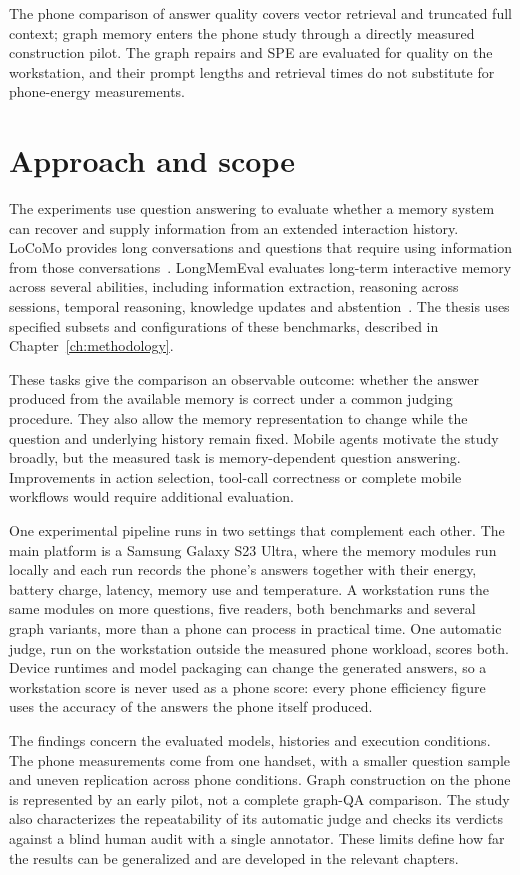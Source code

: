 The phone comparison of answer quality covers vector retrieval and truncated full context;
graph memory enters the phone study through a directly measured construction pilot. The graph
repairs and SPE are evaluated for quality on the workstation, and their prompt lengths and
retrieval times do not substitute for phone-energy measurements.

\section{Approach and scope}
\label{sec:ch1_scope}

The experiments use question answering to evaluate whether a memory system can recover
and supply information from an extended interaction history. LoCoMo provides long
conversations and questions that require using information from those
conversations~\citep{locomo}. LongMemEval evaluates long-term interactive memory across
several abilities, including information extraction, reasoning across sessions,
temporal reasoning, knowledge updates and abstention~\citep{longmemeval}. The thesis
uses specified subsets and configurations of these benchmarks, described in
Chapter~\ref{ch:methodology}.

These tasks give the comparison an observable outcome: whether the answer produced from
the available memory is correct under a common judging procedure. They also allow the
memory representation to change while the question and underlying history remain fixed.
Mobile agents motivate the study broadly, but the measured task is memory-dependent
question answering. Improvements in action selection, tool-call correctness or complete
mobile workflows would require additional evaluation.

One experimental pipeline runs in two settings that complement each other. The main
platform is a Samsung Galaxy S23 Ultra, where the memory modules run locally and each run
records the phone's answers together with their energy, battery charge, latency, memory use
and temperature. A workstation runs the same modules on more questions, five readers, both
benchmarks and several graph variants, more than a phone can process in practical time. One
automatic judge, run on the workstation outside the measured phone workload, scores both.
Device runtimes and model packaging can change the generated answers, so a workstation score
is never used as a phone score: every phone efficiency figure uses the accuracy of the answers
the phone itself produced.

The findings concern the evaluated models, histories and execution conditions. The
phone measurements come from one handset, with a smaller question sample and uneven
replication across phone conditions. Graph construction on the phone is
represented by an early pilot, not a complete graph-QA comparison. The study
also characterizes the repeatability of its automatic judge and checks its verdicts against a
blind human audit with a single annotator. These limits define how far the results can be
generalized and are developed in the relevant chapters.

